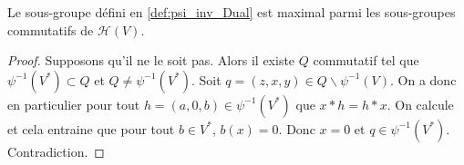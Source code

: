 \begin{proposition}
    \label{prop:psi_inv_Dual_max}
    \leanok

    Le sous-groupe défini en \ref{def:psi_inv_Dual} est maximal parmi les sous-groupes
    commutatifs de $\mathcal{H}(V)$.
    \begin{proof}
        \leanok 
        Supposons qu'il ne le soit pas. Alors il existe $Q$ commutatif tel que
        $\psi^{-1}(V^*)\subset Q$ et $Q\ne \psi^{-1}(V^*)$. Soit $q=(z,x,y)\in Q\backslash \psi^{-1}(V)$.
        On a donc en particulier pour tout $h=(a,0,b)\in \psi^{-1}(V^*)$ que $x*h=h*x$. On 
        calcule et cela entraine que pour tout $b\in V^*$, $b(x)=0$. Donc $x=0$ et $q\in \psi^{-1}(V^*)$.
        Contradiction.
    \end{proof}
\end{proposition}
